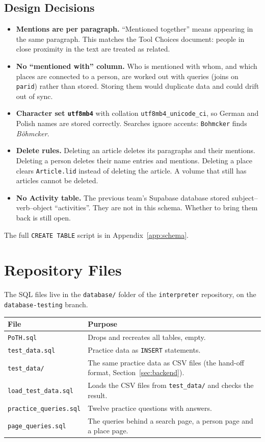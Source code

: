 \documentclass[11pt]{article}
\newcommand{\code}[1]{\texttt{#1}}
\begin{document}
\subsection{Design Decisions}

\begin{itemize}
  \item \textbf{Mentions are per paragraph.} ``Mentioned together'' means
  appearing in the same paragraph. This matches the Tool Choices document:
  people in close proximity in the text are treated as related.
  \item \textbf{No ``mentioned with'' column.} Who is mentioned with whom,
  and which places are connected to a person, are worked out with queries
  (joins on \code{parid}) rather than stored. Storing them would duplicate
  data and could drift out of sync.
  \item \textbf{Character set \code{utf8mb4}} with collation
  \code{utf8mb4\_unicode\_ci}, so German and Polish names are stored
  correctly. Searches ignore accents: \code{Bohmcker} finds
  \textit{Böhmcker}.
  \item \textbf{Delete rules.} Deleting an article deletes its paragraphs
  and their mentions. Deleting a person deletes their name entries and
  mentions. Deleting a place clears \code{Article.lid} instead of deleting
  the article. A volume that still has articles cannot be deleted.
  \item \textbf{No Activity table.} The previous team's Supabase database
  stored subject--verb--object ``activities''. They are not in this schema.
  Whether to bring them back is still open.
\end{itemize}

The full \code{CREATE TABLE} script is in Appendix~\ref{app:schema}.

\section{Repository Files}

The SQL files live in the \code{database/} folder of the
\code{interpreter} repository, on the \code{database-testing} branch.

\begin{tabular}{|L{1.75in}|L{3.65in}|}
\hline
\textbf{File} & \textbf{Purpose} \\
\hline
\code{PoTH.sql} & Drops and recreates all tables, empty. \\
\hline
\code{test\_data.sql} & Practice data as \code{INSERT} statements. \\
\hline
\code{test\_data/} & The same practice data as CSV files (the hand-off
format, Section~\ref{sec:backend}). \\
\hline
\code{load\_test\_data.sql} & Loads the CSV files from \code{test\_data/}
and checks the result. \\
\hline
\code{practice\_queries.sql} & Twelve practice questions with answers. \\
\hline
\code{page\_queries.sql} & The queries behind a search page, a person
page and a place page. \\
\hline
\end{tabular}
\end{document}
